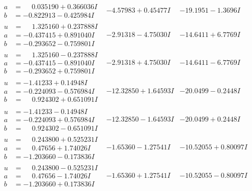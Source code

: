 \documentclass[1p]{elsarticle_modified}
\theoremstyle{definition}
\begin{document}
$$\begin{array}{c|c|c}
\begin{aligned}
a &= \phantom{-}0.035190 + 0.366036 I \\
b &= -0.822913 - 0.425984 I\end{aligned}
 & -4.57983 + 0.45477 I & -19.1951 - 1.3696 I \\ \hline\begin{aligned}
u &= \phantom{-}1.325160 + 0.237888 I \\
a &= -0.437415 + 0.891040 I \\
b &= -0.293652 - 0.759801 I\end{aligned}
 & -2.91318 - 4.75030 I & -14.6411 + 6.7769 I \\ \hline\begin{aligned}
u &= \phantom{-}1.325160 - 0.237888 I \\
a &= -0.437415 - 0.891040 I \\
b &= -0.293652 + 0.759801 I\end{aligned}
 & -2.91318 + 4.75030 I & -14.6411 - 6.7769 I \\ \hline\begin{aligned}
u &= -1.41233 + 0.14948 I \\
a &= -0.224093 - 0.576984 I \\
b &= \phantom{-}0.924302 + 0.651091 I\end{aligned}
 & -12.32850 + 1.64593 I & -20.0499 - 0.2448 I \\ \hline\begin{aligned}
u &= -1.41233 - 0.14948 I \\
a &= -0.224093 + 0.576984 I \\
b &= \phantom{-}0.924302 - 0.651091 I\end{aligned}
 & -12.32850 - 1.64593 I & -20.0499 + 0.2448 I \\ \hline\begin{aligned}
u &= \phantom{-}0.243800 + 0.525231 I \\
a &= \phantom{-}0.47656 + 1.74026 I \\
b &= -1.203660 - 0.173836 I\end{aligned}
 & -1.65360 - 1.27541 I & -10.52055 + 0.80097 I \\ \hline\begin{aligned}
u &= \phantom{-}0.243800 - 0.525231 I \\
a &= \phantom{-}0.47656 - 1.74026 I \\
b &= -1.203660 + 0.173836 I\end{aligned}
 & -1.65360 + 1.27541 I & -10.52055 - 0.80097 I \\ \hline\begin{aligned}

\end{aligned}
\end{array}$$
\end{document}
